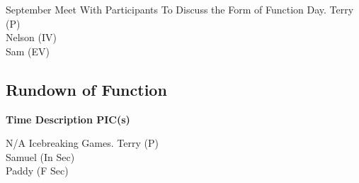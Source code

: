 \bTR{}
\eTD{} September
\eTD\bTD Meet With Participants To Discuss the Form of Function Day.
\eTD\bTD Terry (P) \\ Nelson (IV) \\ Sam (EV)
\eTD\eTR

\eTABLEbody
\eTABLE

\pagebreak
\subsection{Rundown of Function}

\setupTABLE[c][1][width=1.25in]
\setupTABLE[c][2][width=3.5in]
\setupTABLE[c][3][width=1.25in]
\bTABLE
\bTABLEhead

\bTR\bTH    \bf{Time}
\eTH\bTH    \bf{Description}
\eTH\bTH    \bf{PIC(s)}
\eTH\eTR

\eTABLEhead
\bTABLEbody

\bTR\bTD N/A
\eTD\bTD Icebreaking Games.
\eTD\bTD Terry (P) \\ Samuel (In Sec) \\ Paddy (F Sec)
\eTD\eTR

\eTABLEbody
\eTABLE

\pagebreak

